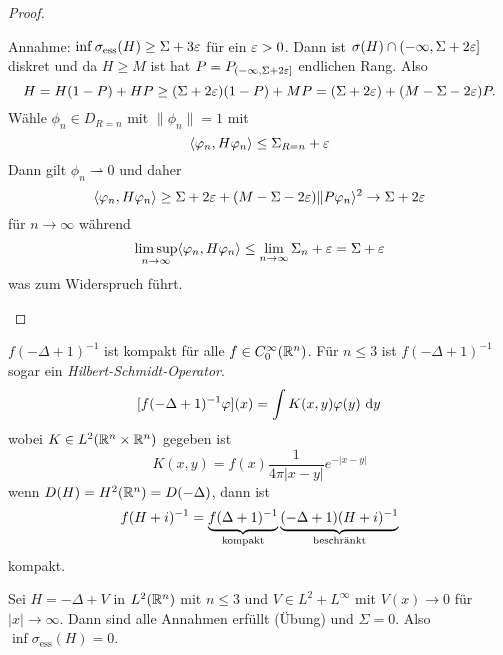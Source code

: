 \documentclass{mycourse}
\begin{document}
\begin{proof}
\begin{seg}
Annahme: $\inf \sigma_{\text{ess}}(H) \ge \Sigma + 3\eps$ für ein $\eps >0$. Dann ist $\sigma(H) \cap (-\infty, \Sigma + 2\eps]$ diskret und da $H\ge M$ ist hat $P=P_{(-\infty, \Sigma+2\eps]}$ endlichen Rang. Also
\[
H=H(1-P) + HP \ge (\Sigma+2\eps)(1-P)+MP= (\Sigma + 2\eps) +(M-\Sigma-2\eps)P.
\]
Wähle $\phi_n \in D_{R=n}$ mit $\| \phi_n\| =1$ mit
\[
\< \phi_n, H\phi_n\> \le \Sigma_{R=n} + \eps
\]
Dann gilt $\phi_n \rightharpoonup 0$ und daher
\[
\< \phi_n, H\phi_n \> \ge \Sigma+ 2\eps + (M-\Sigma-2\eps) \| P\phi_n \>^2 \to \Sigma+2\eps
\]
für $n\to \infty$ während
\[
\limsup_{n\to \infty} \< \phi_n, H\phi_n\> \le \lim_{n\to \infty} \Sigma_n + \eps = \Sigma + \eps
\]
was zum Widerspruch führt.
\end{seg}
\end{proof}

\begin{nt*}
$f(-\Delta+1)^{-1}$ ist kompakt für alle $f\in C_0^\infty(\R^n)$. Für $n\le 3$ ist $f(-\Delta+1)^{-1}$ sogar ein \emph{Hilbert-Schmidt-Operator}.
\[
[f(-\Delta+1)^{-1} \phi] (x) = \int K(x,y) \phi(y) \, \dx[y]
\]
wobei $K\in L^2(\R^n \times \R^n)$ gegeben ist
\[
K(x,y) =f(x) \frac{1}{4\pi |x-y|} e^{-|x-y|}
\]
wenn $D(H)=H^2(\R^n) = D(-\Delta)$, dann ist
\[
f(H+i)^{-1} = \underbrace{f(\-\Delta +1)^{-1}}_{\text{kompakt}} \underbrace{(-\Delta +1) (H+i)^{-1}}_{\text{beschränkt}}
\]
kompakt.
\end{nt*}
\begin{ex*}
Sei $H=-\Delta+V$ in $L^2(\R^n)$ mit $n\le 3$ und $V\in L^2 + L^\infty$ mit $V(x)\to 0$ für $|x|\to \infty$. Dann sind alle Annahmen erfüllt (Übung) und $\Sigma=0$. Also $\inf \sigma_{\text{ess}}(H) = 0$.
\fixme[fig5]
\end{ex*}
\end{document}
